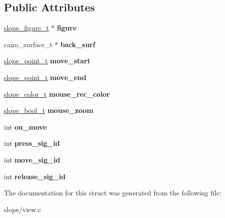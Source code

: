 \subsection*{Public Attributes}
\begin{DoxyCompactItemize}
\item 
\hypertarget{struct__SlopeViewPrivate_aafdec47c695b1fb1ed2374f55d4345ae}{\hyperlink{group__Figure_ga507cc82eeca8255d6c0f603ffdaeb59e}{slope\+\_\+figure\+\_\+t} $\ast$ {\bfseries figure}}\label{struct__SlopeViewPrivate_aafdec47c695b1fb1ed2374f55d4345ae}

\item 
\hypertarget{struct__SlopeViewPrivate_aa85fbecab3e04e09e70268e513a51aad}{cairo\+\_\+surface\+\_\+t $\ast$ {\bfseries back\+\_\+surf}}\label{struct__SlopeViewPrivate_aa85fbecab3e04e09e70268e513a51aad}

\item 
\hypertarget{struct__SlopeViewPrivate_a19d3d175ce68cbf2e30cd85249e7edf6}{\hyperlink{struct__slope__point}{slope\+\_\+point\+\_\+t} {\bfseries move\+\_\+start}}\label{struct__SlopeViewPrivate_a19d3d175ce68cbf2e30cd85249e7edf6}

\item 
\hypertarget{struct__SlopeViewPrivate_a1ff87d94e9ce2bfe356f4263e67a32cd}{\hyperlink{struct__slope__point}{slope\+\_\+point\+\_\+t} {\bfseries move\+\_\+end}}\label{struct__SlopeViewPrivate_a1ff87d94e9ce2bfe356f4263e67a32cd}

\item 
\hypertarget{struct__SlopeViewPrivate_ab248d01239b98c865d508e41aa38ac1e}{\hyperlink{struct__slope__color}{slope\+\_\+color\+\_\+t} {\bfseries mouse\+\_\+rec\+\_\+color}}\label{struct__SlopeViewPrivate_ab248d01239b98c865d508e41aa38ac1e}

\item 
\hypertarget{struct__SlopeViewPrivate_afb48401b5966a0e545d0062797143176}{\hyperlink{group__Primitives_gac55afa016ca777119a6c343d1655d558}{slope\+\_\+bool\+\_\+t} {\bfseries mouse\+\_\+zoom}}\label{struct__SlopeViewPrivate_afb48401b5966a0e545d0062797143176}

\item 
\hypertarget{struct__SlopeViewPrivate_a956462aa9254d2beff0581b7449017c9}{int {\bfseries on\+\_\+move}}\label{struct__SlopeViewPrivate_a956462aa9254d2beff0581b7449017c9}

\item 
\hypertarget{struct__SlopeViewPrivate_a87e2e6ba1fa27e792bd82b8fb1658615}{int {\bfseries press\+\_\+sig\+\_\+id}}\label{struct__SlopeViewPrivate_a87e2e6ba1fa27e792bd82b8fb1658615}

\item 
\hypertarget{struct__SlopeViewPrivate_a027e97def0a6bde19c2e9ec2daa7a754}{int {\bfseries move\+\_\+sig\+\_\+id}}\label{struct__SlopeViewPrivate_a027e97def0a6bde19c2e9ec2daa7a754}

\item 
\hypertarget{struct__SlopeViewPrivate_a1c2d5d2faac3c86ad07877c415127580}{int {\bfseries release\+\_\+sig\+\_\+id}}\label{struct__SlopeViewPrivate_a1c2d5d2faac3c86ad07877c415127580}

\end{DoxyCompactItemize}


The documentation for this struct was generated from the following file\+:\begin{DoxyCompactItemize}
\item 
slope/view.\+c\end{DoxyCompactItemize}
